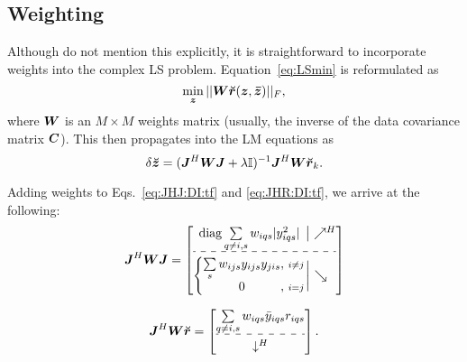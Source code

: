 \documentclass[useAMS,usenatbib]{mn2e}
\makeatletter
\newcommand{\II}{\mathbb{I}}
\newcommand{\mat}[1]{{\bmath{#1}}}
\newcommand{\JJ}{\mat{J}} %
\newcommand{\MM}{\mat{M}}
\newcommand{\GG}{\mat{G}}
\newcommand{\Matrix}[2]{\left [ \begin{array}{@{}#1@{}}#2\end{array} \right ]}
\newcommand{\Stack}[1]{\begin{array}{@{}c@{}}#1\end{array}}
\newcommand{\AUG}[1]{\bmath{\breve{#1}}}
\newcommand{\Zz}{\AUG{z}}
\newcommand{\Rr}{\AUG{r}}
\numberwithin{equation}{section}
\makeatother
\begin{document}
\subsection{Weighting}
\label{sec:DI:W}

Although \citet{ComplexOpt} do not mention this explicitly, it is straightforward to incorporate weights into the 
complex LS problem. Equation~\ref{eq:LSmin} is reformulated as
\begin{equation}
\label{eq:LSmin:w}
\min_{\bmath{z}} ||\mat{W} \Rr(\bmath{z},\bmath{\bar z})||_F,
\end{equation}
where $\mat{W}$ is an $M\times M$ weights matrix (usually, the inverse of the data covariance matrix $\mat{C}$). This then propagates into the LM equations as
\begin{equation}
\label{eq:LM:W}
\delta\Zz = (\JJ^H \mat{W} \JJ + \lambda\II)^{-1}\JJ^H \mat{W} \Rr_k.
\end{equation}

Adding weights to Eqs.~\ref{eq:JHJ:DI:tf} and \ref{eq:JHR:DI:tf}, we arrive at the following:
\begin{equation}
\label{eq:JHJ:DI:tfw}
\JJ^H\mat{W}\JJ = 
\JHJblocks{
  \mathrm{diag} \sum\limits_{q\ne i,s} w_{iqs} |y^2_{iqs}|
}{
  \left \{ 
  \begin{array}{@{}c@{,~}c@{}}
   \sum\limits_{s} w_{ijs} y_{ijs}y_{jis}&{\scriptstyle i\ne j} \\
   0 &{\scriptstyle i=j}
  \end{array} \right . 
}
\end{equation}

\begin{equation}
\label{eq:JHR:DI:tfw}
\JJ^H\mat{W}\Rr 
= \Matrix{c}{
\sum\limits_{q\ne i,s} w_{iqs} \bar{y}_{iqs} r_{iqs}   \\
\hdashline\\[-8pt]
\downarrow^H
}.
\end{equation}


\newcommand{\GGd}{\GG^{(d)}}
\newcommand{\GGdH}{\GG^{(d)H}}
\newcommand{\MMd}{\MM^{(d)}}
\newcommand{\YYd}{\YY^{(d)}}
\newcommand{\YYdH}{\YY^{(d)H}}
\newcommand{\YYc}{\YY^{(c)}}
\newcommand{\YYcH}{\YY^{(c)H}}
\newcommand{\ggd}{g^{(d)}}
\newcommand{\ggdH}{\bar{g}^{(d)}}
\newcommand{\ggc}{g^{(c)}}
\newcommand{\ggcH}{\bar{g}^{(c)}}
\newcommand{\mmc}{m^{(c)}}
\newcommand{\mmd}{m^{(d)}}
\newcommand{\mmcH}{\bar{m}^{(c)}}
\newcommand{\mmdH}{\bar{m}^{(d)}}
\newcommand{\yyd}{y^{(d)}}
\newcommand{\yydH}{\bar{y}^{(d)}}
\newcommand{\yyc}{y^{(c)}}
\newcommand{\yycH}{\bar{y}^{(c)}}
\end{document}
